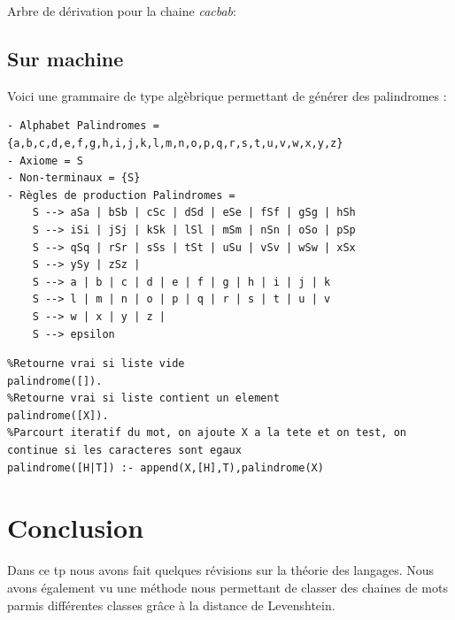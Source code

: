 \documentclass[a4paper,12pt]{report}
\begin{document}
Arbre de dérivation pour la chaine \textit{cacbab}:
\begin{center}
\end{center}
\newpage
\subsection*{Sur machine}

Voici une grammaire de type algèbrique permettant de générer des palindromes :
\begin{verbatim}
- Alphabet Palindromes = {a,b,c,d,e,f,g,h,i,j,k,l,m,n,o,p,q,r,s,t,u,v,w,x,y,z}
- Axiome = S
- Non-terminaux = {S}
- Règles de production Palindromes =
    S --> aSa | bSb | cSc | dSd | eSe | fSf | gSg | hSh  
    S --> iSi | jSj | kSk | lSl | mSm | nSn | oSo | pSp 
    S --> qSq | rSr | sSs | tSt | uSu | vSv | wSw | xSx 
    S --> ySy | zSz | 
    S --> a | b | c | d | e | f | g | h | i | j | k 
    S --> l | m | n | o | p | q | r | s | t | u | v
    S --> w | x | y | z | 
    S --> epsilon
\end{verbatim}
\begin{center}
\hspace{5em}
\end{center}

\begin{lstlisting}
%Retourne vrai si liste vide
palindrome([]). 
%Retourne vrai si liste contient un element
palindrome([X]). 
%Parcourt iteratif du mot, on ajoute X a la tete et on test, on continue si les caracteres sont egaux
palindrome([H|T]) :- append(X,[H],T),palindrome(X)

\end{lstlisting}

\section*{Conclusion}

Dans ce tp nous avons fait quelques révisions sur la théorie des langages. Nous avons également vu une méthode nous permettant de classer des chaines de mots parmis différentes classes grâce à la distance de Levenshtein.
\end{document}
